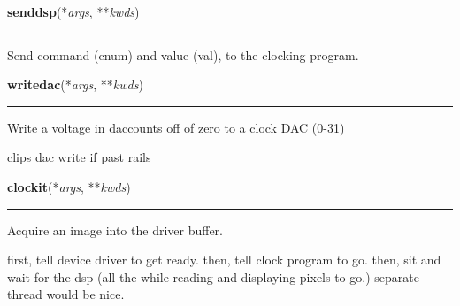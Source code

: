     \label{dsp:senddsp}

    \vspace{0.5ex}

    \begin{boxedminipage}{\textwidth}

    \raggedright \textbf{senddsp}(*\textit{args}, **\textit{kwds})

    \vspace{-1.5ex}

    \rule{\textwidth}{0.5\fboxrule}
    Send command (cnum) and value (val), to the clocking program.

    \vspace{1ex}

    \end{boxedminipage}

    \label{dsp:writedac}

    \vspace{0.5ex}

    \begin{boxedminipage}{\textwidth}

    \raggedright \textbf{writedac}(*\textit{args}, **\textit{kwds})

    \vspace{-1.5ex}

    \rule{\textwidth}{0.5\fboxrule}
    Write a voltage in daccounts off of zero to a clock DAC (0-31)

    clips dac write if past rails

    \vspace{1ex}

    \end{boxedminipage}

    \label{dsp:clockit}

    \vspace{0.5ex}

    \begin{boxedminipage}{\textwidth}

    \raggedright \textbf{clockit}(*\textit{args}, **\textit{kwds})

    \vspace{-1.5ex}

    \rule{\textwidth}{0.5\fboxrule}
    Acquire an image into the driver buffer.

    first, tell device driver to get ready. then, tell clock program to go.
    then, sit and wait for the dsp (all the while reading and displaying 
    pixels to go.) separate thread would be nice.

    \vspace{1ex}

    \end{boxedminipage}

